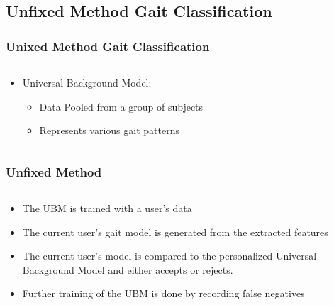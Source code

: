 \documentclass{beamer}
\begin{document}
\subsection{Unfixed Method Gait Classification}
\begin{frame}
\frametitle{Unixed Method Gait Classification}
 \begin{columns}
  \begin{column}{.9\textwidth}
			\begin{itemize}
				\item Universal Background Model: 
				\begin{itemize}
					\item Data Pooled from a group of subjects
					\item Represents various gait patterns
				\end{itemize}	
			\end{itemize}
  \end{column}
  \begin{column}{0.4\textwidth}
       \\
  \end{column}
  \end{columns}  
  
\end{frame}
 \begin{frame}
\frametitle{Unfixed Method }
 \begin{columns}
  \begin{column}{.9\textwidth}
  \begin{itemize}
		\item The UBM is trained with a user's data
		\linebreak
		\item The current user's gait model is generated from the extracted features
		\linebreak
		\item The current user's model is compared to the personalized Universal Background Model and either accepts or rejects.
		\linebreak
		\item Further training of the UBM is done by recording false negatives
  \end{itemize}
  \end{column}
  \begin{column}{0.2\textwidth}
       \\
  \end{column}
  \end{columns}  
\end{frame}
\end{document}
